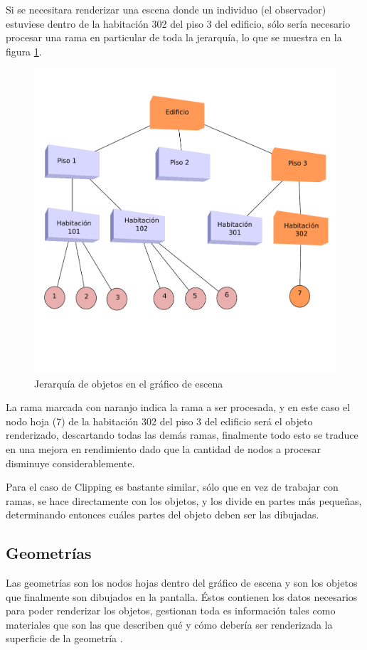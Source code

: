 \documentclass[a4paper,12pt,openany,oneside]{book}
\begin{document}
Si se necesitara renderizar una escena donde un individuo (el observador) estuviese dentro de la habitación 302 del piso 3 del edificio, sólo sería necesario procesar una rama en particular de toda la jerarquía, lo que se muestra en la figura \ref{culling2label}.
\begin{figure}[!hbp]
\begin{center}
\includegraphics[scale=0.7]{culling2.pdf}
\caption[Ejemplo Culling 2]{Jerarquía de objetos en el gráfico de escena}\label{culling2label}
\end{center}
\end{figure}

La rama marcada con naranjo indica la rama a ser procesada, y en este caso el nodo hoja (7) de la habitación 302 del piso 3 del edificio será el objeto renderizado, descartando todas las demás ramas, finalmente todo esto se traduce en una mejora en rendimiento dado que la cantidad de nodos a procesar disminuye considerablemente. 

Para el caso de Clipping es bastante similar, sólo que en vez de trabajar con ramas, se hace directamente con los objetos, y los divide en partes más pequeñas, determinando entonces cuáles partes del objeto deben ser las dibujadas. 
\subsection{Geometrías}
Las geometrías son los nodos hojas dentro del gráfico de escena y son los objetos que finalmente son dibujados en la pantalla. Éstos contienen los datos necesarios para poder renderizar los objetos, gestionan toda es información tales como materiales que son las que describen qué y cómo debería ser renderizada la superficie de la geometría \cite{BEGINNERS}.
\end{document}
